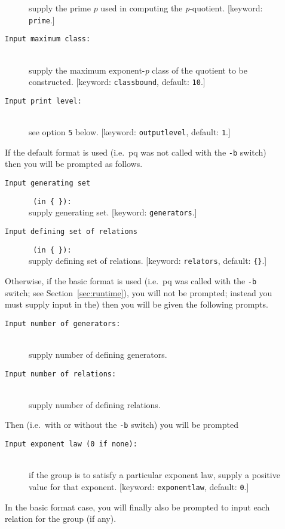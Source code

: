 \documentclass[12pt]{article}
\begin{document}
\begin{description}
\begin{description}
  supply the prime $p$ used in computing the {\it p}-quotient.
  [keyword: \texttt{prime}.]
 \item[\texttt{Input maximum class:}]\ \\
  supply the maximum exponent-{\it p} class of the quotient to be constructed.
  [keyword: \texttt{classbound}, default: \texttt{10}.]
 \item[\texttt{Input print level:}]\ \\
  see option \texttt{5} below.
  [keyword: \texttt{outputlevel}, default: \texttt{1}.]
 \end{description}
 If the default format is used (i.e.\ pq was not called with the \texttt{-b}
 switch) then you will be prompted as follows. 
 \begin{description}
 \item[\texttt{Input generating set}]\hspace*{-0.5em}\verb| (in { }):|\\
  supply generating set. 
  [keyword: \texttt{generators}.]
 \item[\texttt{Input defining set of relations}]\hspace*{-0.5em}\verb| (in { }):|\\
  supply defining set of relations.
  [keyword: \texttt{relators}, default: \verb|{}|.]
 \end{description}
 Otherwise, if the basic format is used (i.e.\ pq was called with the 
 \texttt{-b} switch; see Section~\ref{sec:runtime}), you will not be
 prompted; instead you must supply input in the) then you will be given the 
 following prompts.
 \begin{description}
 \item[\texttt{Input number of generators:}]\ \\
  supply number of defining generators.
 \item[\texttt{Input number of relations:}]\ \\
  supply number of defining relations.
 \end{description}
 Then (i.e.\ with or without the \texttt{-b} switch) you will be prompted
 \enlargethispage*{1\baselineskip}
 \begin{description}
 \item[\texttt{Input exponent law (0 if none):}]\ \\
  if the group is to satisfy a particular exponent law, supply a positive
  value for that exponent.
  [keyword: \texttt{exponentlaw}, default: \texttt{0}.]
 \end{description}
 In the basic format case, you will finally also be prompted to input each 
 relation for the group (if any).


\end{description}
\end{document}
